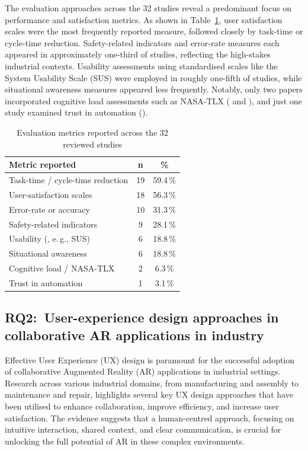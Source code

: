 The evaluation approaches across the 32 studies reveal a predominant focus on performance and satisfaction metrics. As shown in Table~\ref{tab:evaluation-metrics}, user satisfaction scales were the most frequently reported measure, followed closely by task-time or cycle-time reduction. Safety-related indicators and error-rate measures each appeared in approximately one-third of studies, reflecting the high-stakes industrial contexts. Usability assessments using standardised scales like the System Usability Scale (SUS) were employed in roughly one-fifth of studies, while situational awareness measures appeared less frequently. Notably, only two papers incorporated cognitive load assessments such as NASA-TLX (\cite{aschenbrenner2019comparing} and \cite{chan2022design}), and just one study examined trust in automation (\cite{cogurcu2023comparative}).

\begin{table}[t!]
\centering
\caption{Evaluation metrics reported across the 32 reviewed studies}
\label{tab:evaluation-metrics}
\begin{tabular}{@{}lcc@{}}
\toprule
\textbf{Metric reported} & \textbf{n} & \textbf{\%} \\
\midrule
Task-time / cycle-time reduction & 19 & 59.4\,\% \\
User-satisfaction scales & 18 & 56.3\,\% \\
Error-rate or accuracy & 10 & 31.3\,\% \\
Safety-related indicators & 9 & 28.1\,\% \\
Usability (, e.\,g., SUS) & 6 & 18.8\,\% \\
Situational awareness & 6 & 18.8\,\% \\
Cognitive load / NASA-TLX & 2 & 6.3\,\% \\
Trust in automation & 1 & 3.1\,\% \\
\bottomrule
\end{tabular}
\end{table}


\subsection{RQ2:~User-experience design approaches in collaborative AR applications in industry}\label{sec:lit-rq2}

Effective User Experience (UX) design is paramount for the successful adoption of collaborative Augmented Reality (AR) applications in industrial settings. Research across various industrial domains, from manufacturing and assembly to maintenance and repair, highlights several key UX design approaches that have been utilised to enhance collaboration, improve efficiency, and increase user satisfaction. The evidence suggests that a human-centred approach, focusing on intuitive interaction, shared context, and clear communication, is crucial for unlocking the full potential of AR in these complex environments.

